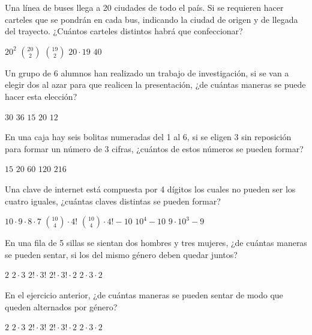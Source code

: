 \documentclass[sin nombre]{srs}
\begin{document}
\separador

\begin{preguntas}[after-item-skip=2cm]
\pregunta Una línea de buses llega a 20 ciudades de todo el país. Si se requieren hacer carteles que se pondrán en cada bus, indicando la ciudad de origen y de llegada del trayecto. ¿Cuántos carteles distintos habrá que confeccionar?
\begin{vertical}
\alternativa $20^2$
\alternativa $\binom{20}{2}$
\alternativa $\binom{19}{2}$
\alternativa $20 \cdot 19$
\alternativa $40$
\end{vertical}

\pregunta Un grupo de 6 alumnos han realizado un trabajo de investigación, si se van a elegir dos al azar para que realicen la presentación, ¿de cuántas maneras se puede hacer esta elección?
\begin{vertical}
\alternativa $30$
\alternativa $36$
\alternativa $15$
\alternativa $20$
\alternativa $12$
\end{vertical}

\pregunta En una caja hay seis bolitas numeradas del 1 al 6, si se eligen 3 sin reposición para formar un número de 3 cifras, ¿cuántos de estos números se pueden formar?
\begin{vertical}
\alternativa $15$
\alternativa $20$
\alternativa $60$
\alternativa $120$
\alternativa $216$
\end{vertical}

\pregunta Una clave de internet está compuesta por 4 dígitos los cuales no pueden ser los cuatro iguales, ¿cuántas claves distintas se pueden formar?
\begin{vertical}
\alternativa $10 \cdot 9 \cdot 8 \cdot 7$
\alternativa $\binom{10}{4} \cdot 4!$
\alternativa $\binom{10}{4} \cdot 4! - 10$
\alternativa $10^4 - 10$
\alternativa $9 \cdot 10^3 - 9$
\end{vertical}

\pregunta En una fila de 5 sillas se sientan dos hombres y tres mujeres, ¿de cuántas maneras se pueden sentar, si los del mismo género deben quedar juntos?
\begin{vertical}
\alternativa $2$
\alternativa $2 \cdot 3$
\alternativa $2! \cdot 3!$
\alternativa $2! \cdot 3! \cdot 2$
\alternativa $2 \cdot 3 \cdot 2$
\end{vertical}

\pregunta En el ejercicio anterior, ¿de cuántas maneras se pueden sentar de modo que queden alternados por género?
\begin{vertical}
\alternativa $2$
\alternativa $2 \cdot 3$
\alternativa $2! \cdot 3!$
\alternativa $2! \cdot 3! \cdot 2$
\alternativa $2 \cdot 3 \cdot 2$
\end{vertical}


\end{preguntas}
\end{document}
